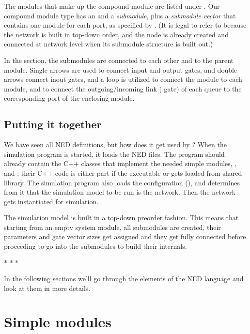 The modules that make up the compound module are listed under
. Our  compound module type has an  and
a  \textit{submodule}, plus a  \textit{submodule
vector} that contains one  module for each port, as specified by
. (It is legal to refer to  because
the network is built in top-down order, and the node is already created and
connected at network level when its submodule structure is built out.)

In the  section, the submodules are connected to each
other and to the parent module. Single arrows are used to connect input and
output gates, and double arrows connect inout gates, and a  loop
is utilized to connect the  module to each  module, and
to connect the outgoing/incoming link ( gate) of each queue to the
corresponding port of the enclosing module.


\subsection{Putting it together}

We have seen all NED definitions, but how does it get used by {\opp}? When
the simulation program is started, it loads the NED files. The program
should already contain the C++ classes that implement the needed simple
modules, ,  and ; their C++ code is either
part if the executable or gets loaded from shared library. The simulation
program also loads the configuration (), and determines
from it that the simulation model to be run is the  network.
Then the network gets instantiated for simulation.

The simulation model is built in a top-down preorder fashion. This means
that starting from an empty system module, all submodules are created,
their parameters and gate vector sizes get assigned and they get fully connected
before proceeding to go into the submodules to build their internals.

\bigskip
\begin{center}
* * *
\end{center}
\bigskip

In the following sections we'll go through the elements of the NED
language and look at them in more details.



\section{Simple modules}
\label{sec:ch-ned-lang:simple-modules}

